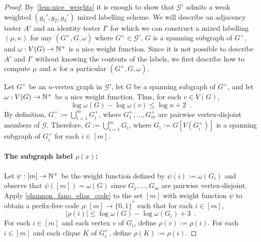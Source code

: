 \documentclass{patmorin}
\renewcommand{\le}{\leqslant}
\newcommand{\calG}{\mathcal{G}}
\begin{document}
\begin{proof}
  By~\cref{lem:nice_weights} it is enough to show that $\calG'$ admits a weak weighted $(g_1',g_2,g_3')$ mixed labelling scheme. We will describe an adjacency tester $A'$ and an identity tester $I'$ for which we can construct a mixed labelling $(\mu,\kappa)$ for any $(G^+,G,\omega)$ where $G^+\in\calG'$, $G$ is a spanning subgraph of $G^+$, and $\omega:V(G)\to\mathbb{N}^+$ is a nice weight function.
  Since it is not possible to describe $A'$ and $I'$ without knowing the contents of the labels, we first describe how to compute $\mu$ and $\kappa$ for a particular $(G^+,G,\omega)$.

  Let $G^+$ be an $n$-vertex graph in $\calG'$, let $G$ be a spanning subgraph of $G^+$, and let $\omega:V(G)\to\mathbb{N}^+$ be a nice weight function.
  Thus, for each $v\in V(G)$,
  \begin{equation}
    \label{eq:nice}
    \log\omega(G)-\log\omega(v)\le\log n + 2\enspace.
  \end{equation}
  By definition, $G^+:=\bigcup_{i=1}^m G^+_i$, where $G^+_1,\ldots,G^+_m$ are pairwise vertex-disjoint members of $\calG$.
  Therefore, $G:=\bigcup_{i=1}^m G_i$, where $G_i:=G[V(G^+_i)]$ is a spanning subgraph of $G^+_i$ for each $i\in[m]$.

  \paragraph{\boldmath The subgraph label $\rho(x)$:}
  Let $\psi:[m]\to\mathbb{N}^+$ be the weight function defined by $\psi(i):=\omega(G_i)$ and observe that $\psi([m])=\omega(G)$ since $G_1,\ldots,G_m$ are pairwise vertex-disjoint.
  Apply \cref{shannon_fano_elias_code} to the set $[m]$ with weight function $\psi$ to obtain a prefix-free code $\rho:[m]\to\{0,1\}^*$ such that for each $i\in[m]$,
  \begin{equation}
    \label{eq:pi}
    |\rho(i)|\le\log \omega(G)-\log \omega(G_i)+3\enspace.
  \end{equation}
  For each $i\in[m]$ and each vertex $v$ of $G_i$, define $\rho(v):=\rho(i)$. For each $i\in[m]$ and each clique $K$ of $G^+_i$, define $\rho(K):=\rho(i)$.


\end{proof}
\end{document}
